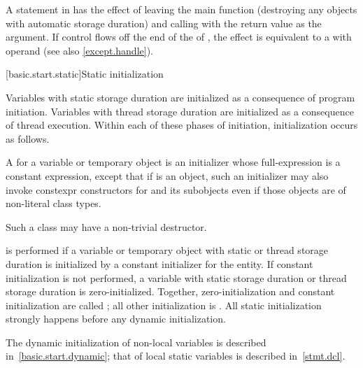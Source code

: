 \pnum
{}%
%
A  statement in  has the effect of leaving the main
function (destroying any objects with automatic storage duration) and
calling  with the return value as the argument.
If control flows off the end of
the  of ,
the effect is equivalent to a  with operand 
(see also \ref{except.handle}).

[basic.start.static]{Static initialization}

\pnum
{}%
%
Variables with static storage duration
are initialized as a consequence of program initiation. Variables with
thread storage duration are initialized as a consequence of thread execution.
Within each of these phases of initiation, initialization occurs as follows.

\pnum
{}%
%
A  for a variable or temporary object 
is an initializer whose full-expression is a
constant expression, except that if  is an object,
such an initializer may also invoke constexpr constructors
for  and its subobjects even if those objects are of non-literal class
types. \begin{note} Such a class may have a non-trivial destructor. \end{note}
 is performed
if a variable or temporary object with static or thread storage duration
is initialized by a constant initializer for the entity.
%
If constant initialization is not performed, a variable with static
storage duration or thread storage
duration is zero-initialized.
Together, zero-initialization and constant initialization are called
%
;
all other initialization is .
All static initialization strongly happens before
any dynamic initialization.
\begin{note} The dynamic initialization of non-local variables is described
in~\ref{basic.start.dynamic}; that of local static variables is described
in~\ref{stmt.dcl}. \end{note}

